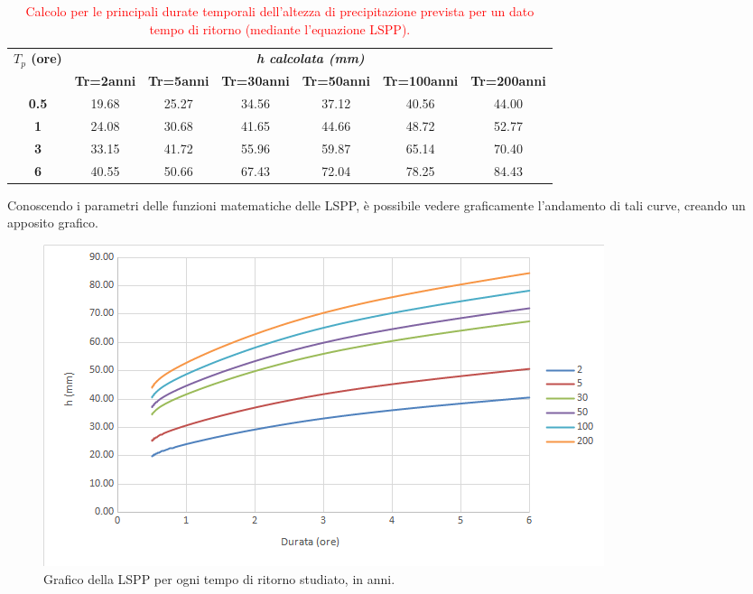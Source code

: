 \begin{table}[H]\centering
    \caption{\textcolor{red}{Calcolo per le principali durate temporali dell'altezza di precipitazione prevista per un dato tempo di ritorno (mediante l'equazione LSPP).}}
    \begin{tabular}{ccccccc}
        \toprule
    \multirow{2}{*}{\textbf{$T_p$ (ore)}} & \multicolumn{6}{c}{\textit{\textbf{h calcolata (mm)}}}  \\
    & \textbf{Tr=2anni} & \textbf{Tr=5anni} & \textbf{Tr=30anni} & \textbf{Tr=50anni} & \textbf{Tr=100anni} & \textbf{Tr=200anni} \\
    \textbf{0.5}                           & 19.68                & 25.27                & 34.56                 & 37.12                 & 40.56                  & 44.00                  \\
    \textbf{1}                             & 24.08                & 30.68                & 41.65                 & 44.66                 & 48.72                  & 52.77                  \\
    \textbf{3}                             & 33.15                & 41.72                & 55.96                 & 59.87                 & 65.14                  & 70.40                  \\
    \textbf{6}                             & 40.55                & 50.66                & 67.43                 & 72.04                 & 78.25                  & 84.43           \\
    \bottomrule      
    \end{tabular}
    \end{table}

Conoscendo i parametri delle funzioni matematiche delle LSPP, è possibile vedere graficamente l'andamento di tali curve, creando un apposito grafico.

\begin{figure}[H]\centering
        \includegraphics[scale=.75]{immagini/LSPP.png}
        \caption{Grafico della LSPP per ogni tempo di ritorno studiato, in anni.}
      \label{LSPP}
\end{figure}

